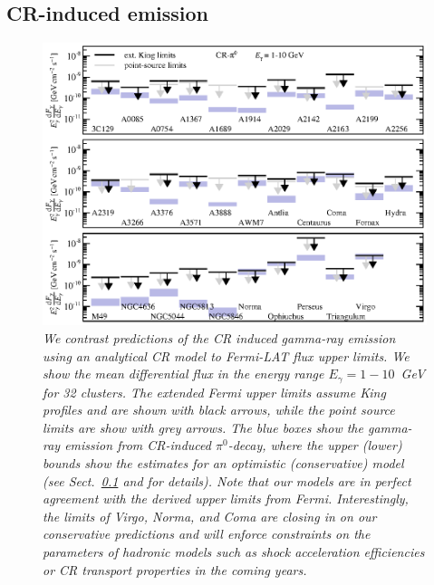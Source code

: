 \documentclass[10pt,aps,pra,reprint,amsmath,amsfonts,amssymb,showpacs,nofootinbib,floatfix]{revtex4-1}
\newcommand{\Fermi}{{\em Fermi}\xspace}
\begin{document}
\subsection{CR-induced emission}
\label{sec:CRemission}
\begin{figure}
\begin{minipage}{2.0\columnwidth}
  \includegraphics[width=0.99\columnwidth]{figures/Fermi.comp.CR.diff.eps}
  \caption{\it We contrast predictions of the CR induced gamma-ray
    emission using an analytical CR model \protect
    \cite{2010MNRAS.409..449P} to \Fermi-LAT flux upper limits. We
    show the mean differential flux in the energy range
    $E_\gamma=1-10$~GeV for 32 clusters. The extended \Fermi upper
    limits assume King profiles and are shown with black arrows, while
    the point source limits are show with grey arrows. The blue boxes
    show the gamma-ray emission from CR-induced $\pi^0$-decay, where
    the upper (lower) bounds show the estimates for an optimistic
    (conservative) model (see Sect.~\ref{sec:CRemission} and
    \cite{2010MNRAS.409..449P} for details). Note that our models are
    in perfect agreement with the derived upper limits from
    \Fermi. Interestingly, the limits of Virgo, Norma, and Coma are
    closing in on our conservative predictions and will enforce
    constraints on the parameters of hadronic models such as shock
    acceleration efficiencies or CR transport properties in the coming
    years.}
 \label{fig15}
\end{minipage}
\end{figure}
\end{document}
